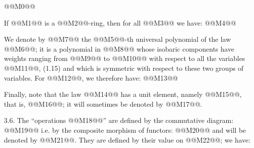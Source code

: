 @@M0@@

If @@M1@@ is a @@M2@@-ring, then for all @@M3@@ we have:
@@M4@@

We denote by @@M7@@ the @@M5@@-th universal polynomial of the law @@M6@@; it is a polynomial in @@M8@@ whose isobaric components have weights ranging from @@M9@@ to @@M10@@ with respect to all the variables @@M11@@, (1.15) and which is symmetric with respect to these two groups of variables. For @@M12@@, we therefore have:
@@M13@@

Finally, note that the law @@M14@@ has a unit element, namely @@M15@@, that is, @@M16@@; it will sometimes be denoted by @@M17@@.

3.6. The ``operations @@M18@@'' are defined by the commutative diagram:
@@M19@@
i.e. by the composite morphism of functors:
@@M20@@
and will be denoted by @@M21@@. They are defined by their value on @@M22@@; we have:
